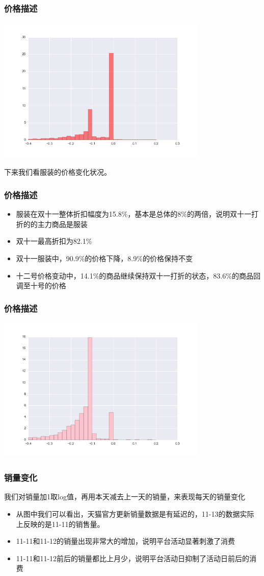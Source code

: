 \documentclass{beamer}
\begin{document}
\begin{frame}
\frametitle{价格描述}
\includegraphics[width=10cm,height=7cm]{cate1_pr.png}
\end{frame}

\begin{frame}
下来我们看服装的价格变化状况。
\frametitle{价格描述}
\begin{itemize}
  \item 服装在双十一整体折扣幅度为15.8\%，基本是总体的8\%的两倍，说明双十一打折的的主力商品是服装
  \item 双十一最高折扣为82.1\%
  \item 双十一服装中，90.9\%的价格下降，8.9\%的价格保持不变
  \item 十二号价格变动中，14.1\%的商品继续保持双十一打折的状态，83.6\%的商品回调至十号的价格
\end{itemize}
\end{frame}

\begin{frame}
\frametitle{价格描述}
\includegraphics[width=10cm,height=7cm]{cate3_pr.png}
\end{frame}



\begin{frame}
\frametitle{销量变化}
我们对销量加1取log值，再用本天减去上一天的销量，来表现每天的销量变化
\begin{itemize}
  \item 从图中我们可以看出，天猫官方更新销量数据是有延迟的，11-13的数据实际上反映的是11-11的销售量。
  \item 11-11和11-12的销量出现非常大的增加，说明平台活动显著刺激了消费
  \item 11-11和11-12前后的销量都比上月少，说明平台活动日抑制了活动日前后的消费
\end{itemize}
\end{frame}
\end{document}
